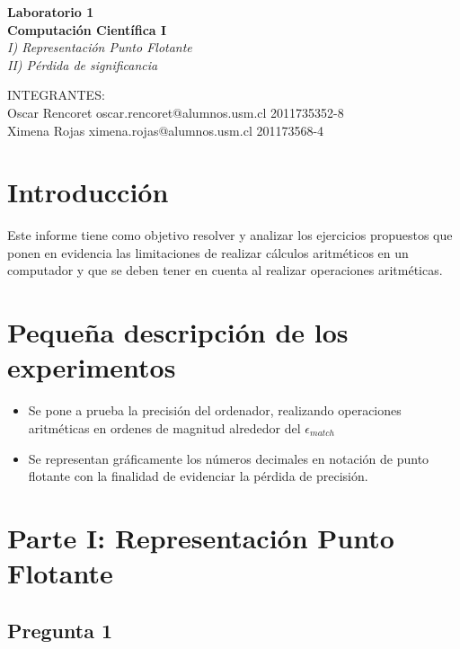 \documentclass[10pt]{article}
\begin{document}
\begin{center}{
\huge\textbf{Laboratorio 1 \\ Computación Científica I}} \\
\bigskip
\textit{I) Representación Punto Flotante \\ II) Pérdida de significancia}

\vspace*{5.0 in}
\small{INTEGRANTES:} \\
\small{Oscar Rencoret oscar.rencoret@alumnos.usm.cl 2011735352-8} \\
\small{Ximena Rojas ximena.rojas@alumnos.usm.cl 201173568-4}
\end{center}

\newpage

\section{Introducción}
Este informe tiene como objetivo resolver y analizar los ejercicios propuestos que ponen en evidencia las limitaciones de realizar cálculos aritméticos en un computador y que se deben tener en cuenta al realizar operaciones aritméticas.

\section{Pequeña descripción de los experimentos}
\begin{itemize}
\item Se pone a prueba la precisión del ordenador, realizando operaciones aritméticas en ordenes de magnitud alrededor del $\epsilon_{match}$ 
\item Se representan gráficamente los números decimales en notación de punto flotante con la finalidad de evidenciar la pérdida de precisión.
\end{itemize}

\section{Parte I: Representación Punto Flotante}

\subsection{Pregunta 1}
\end{document}
